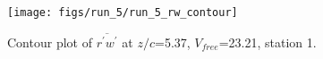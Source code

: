 \begin{figure}[H]
\centering
\texttt{[image: figs/run\_5/run\_5\_rw\_contour]}
\caption{Contour plot of $\overline{r^\prime w^\prime}$ at $z/c$=5.37, $V_{free}$=23.21, station 1.}
\label{fig:run_5_rw_contour}
\end{figure}


